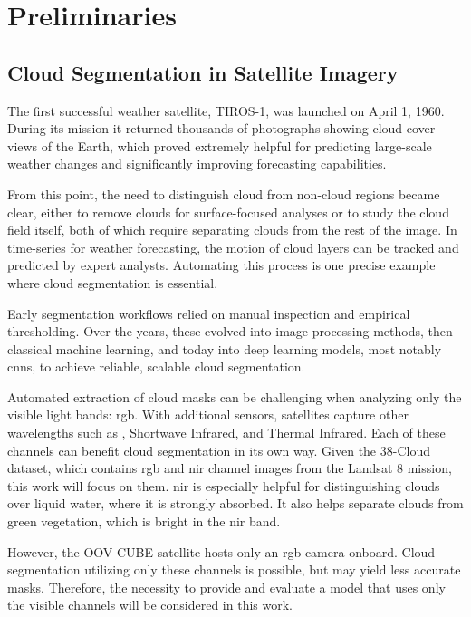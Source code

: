 {

\setlength{\parindent}{0pt}
\setlength{\parskip}{1em}

\chapter{Preliminaries}

\section{Cloud Segmentation in Satellite Imagery}

The first successful weather satellite, TIROS-1, was launched on April 1, 1960.
During its mission it returned thousands of photographs showing cloud-cover views of the Earth,
which proved extremely helpful for predicting large-scale weather changes and significantly improving forecasting capabilities.

From this point, the need to distinguish cloud from non-cloud regions became clear, either to remove clouds for
surface-focused analyses or to study the cloud field itself, both of which require separating clouds from the rest of the image.
In time-series for weather forecasting, the motion of cloud layers can be tracked and predicted by expert analysts.
Automating this process is one precise example where cloud segmentation is essential.

Early segmentation workflows relied on manual inspection and empirical thresholding.
Over the years, these evolved into image processing methods, then classical machine learning,
and today into deep learning models, most notably \glspl{cnn}, to achieve reliable, scalable cloud segmentation.

Automated extraction of cloud masks can be challenging when analyzing only the visible light bands: \gls{rgb}.
With additional sensors, satellites capture other wavelengths such as , Shortwave Infrared, and Thermal Infrared.
Each of these channels can benefit cloud segmentation in its own way.
Given the 38-Cloud dataset, which contains \gls{rgb} and \gls{nir} channel images from the Landsat 8 mission, this work will focus on them.
\gls{nir} is especially helpful for distinguishing clouds over liquid water, where it is strongly absorbed.
It also helps separate clouds from green vegetation, which is bright in the \gls{nir} band.

However, the OOV-CUBE satellite hosts only an \gls{rgb} camera onboard.
Cloud segmentation utilizing only these channels is possible, but may yield less accurate masks.
Therefore, the necessity to provide and evaluate a model that uses only the visible channels will be considered in this work.

}
